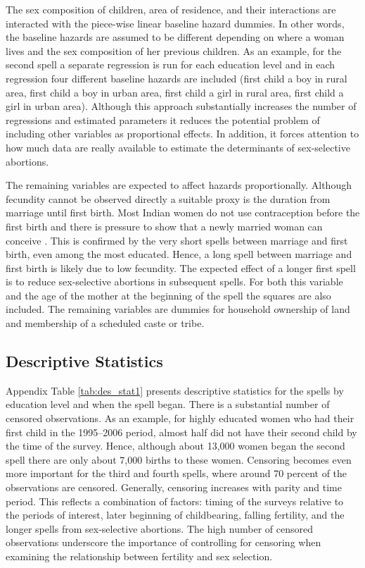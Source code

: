\documentclass[12pt,letterpaper]{article}
\begin{document}
The sex composition of children, area of residence, and their interactions
are interacted with the piece-wise linear baseline hazard dummies.
In other words, the baseline hazards are assumed to be different depending on
where a woman lives and the sex composition of her previous children.
As an example, for the second spell a separate regression is
run for each education level and in each regression four different baseline hazards 
are included (first child a boy in rural area, first child a boy in urban area,
first child a girl in rural area, first child a girl in urban area).
Although this approach substantially increases the number of regressions and estimated parameters it
reduces the potential problem of including other variables as proportional effects.
In addition, it forces attention to how much data are really available to estimate
the determinants of sex-selective abortions.

The remaining variables are expected to affect hazards proportionally.
Although fecundity cannot be observed directly a suitable
proxy is the duration from marriage until first birth.
Most Indian women do not use contraception before the first birth
and there is pressure to show that a newly married woman can conceive \citep{dyson83,Sethuraman2007,Dommaraju2009}.
This is confirmed by the very short spells between marriage and first birth,
even among the most educated.
Hence, a long spell between marriage and first birth is likely due to low fecundity.
The expected effect of a longer first spell is to reduce sex-selective abortions in subsequent spells.
For both this variable and the age of the mother at the beginning of the spell the squares are also included.
The remaining variables are dummies for household ownership of land and membership
of a scheduled caste or tribe.


\subsection{Descriptive Statistics}

Appendix Table \ref{tab:des_stat1} presents descriptive statistics for
the spells by education level and when the spell began.
There is a substantial number of censored observations.
As an example, for highly educated women who had their first child in the 1995--2006
period, almost half did not have their second child by the time of the survey.
Hence, although about 13,000 women began the second spell 
there are only about 7,000 births to these women.
Censoring becomes even more important for the third and fourth
spells, where around 70 percent of the observations are censored.
Generally, censoring increases with parity and time period.
This reflects a combination of factors: timing of the surveys
relative to the periods of interest, later beginning of childbearing, 
falling fertility, and the longer spells from sex-selective abortions.
The high number of censored observations underscore the importance of controlling for
censoring when examining the relationship between fertility and sex selection.
\end{document}
